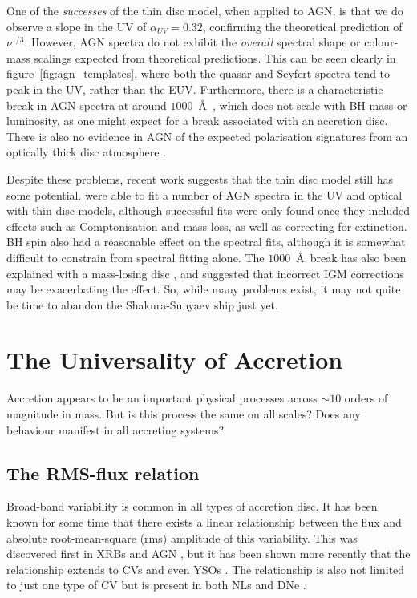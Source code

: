 One of the {\em successes} of the thin disc model, when applied to AGN,
is that we do observe a slope in the UV of $\alpha_{UV} = 0.32$, confirming
the theoretical prediction of $\nu^{1/3}$. 
However, AGN spectra do not exhibit the {\em overall} spectral shape 
\citep[e.g.][]{davis2007,shankar2016} or colour-mass scalings \citep{bonning2007} 
expected from theoretical predictions. 
This can be seen clearly in figure~\ref{fig:agn_templates},
where both the quasar and Seyfert spectra tend to peak in the UV, rather than
the EUV. Furthermore, there is a characteristic break in AGN spectra at
around $1000$~\AA\ \citep{lusso2015}, which does not scale with BH mass or luminosity,
as one might expect for a break associated with an accretion disc. 
There is also no evidence in AGN of the expected polarisation signatures from an 
optically thick disc atmosphere \citep{stockman1979,antonucci1988,antonucci1996}. 

Despite these problems, recent work suggests that the thin disc model 
still has some potential. \cite{capellupo2015} were able to fit a number of
AGN spectra in the UV and optical with thin disc models, although successful fits
were only found once they included effects such as Comptonisation and mass-loss,
as well as correcting for extinction. BH spin also had a reasonable effect on the 
spectral fits, although it is somewhat difficult to constrain from spectral fitting alone.
The $1000$~\AA\ break has also been explained with a mass-losing disc \citep{laordavis2014},
and \cite{lusso2015} suggested that incorrect IGM corrections 
may be exacerbating the effect.
So, while many problems exist, it may not quite be time to 
abandon the Shakura-Sunyaev ship just yet.

\section{The Universality of Accretion}

Accretion appears to be an important physical processes across $\sim10$ orders
of magnitude in mass. But is this process the same on all scales? Does any 
behaviour manifest in all accreting systems? 

\subsection{The RMS-flux relation}

Broad-band variability is common in all types of accretion disc. It has been
known for some time that there exists a linear relationship
between the flux and absolute root-mean-square (rms) amplitude
of this variability. This was discovered first in XRBs and AGN 
\citep{uttley2001, uttley2005, heil2012}, but it has been shown
more recently that the relationship extends to CVs and even YSOs 
\citep{scaringi2012,scaringi2015a}. The relationship is also not limited
to just one type of CV but is present in both NLs and DNe \citep{vandesande2015}.
 
